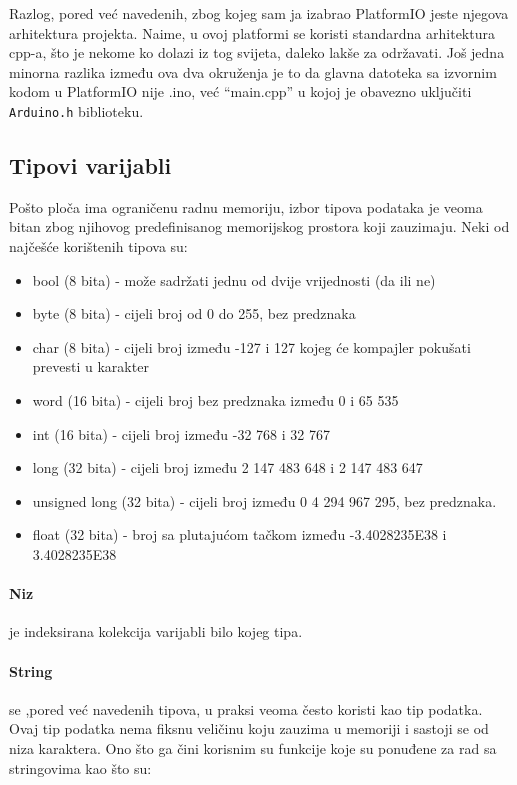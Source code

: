 \documentclass[../Document.tex]{subfiles}
\begin{document}
Razlog, pored već navedenih, zbog kojeg sam ja izabrao PlatformIO jeste njegova arhitektura projekta. Naime, u ovoj platformi se koristi standardna arhitektura cpp-a, što je nekome ko dolazi iz tog svijeta, daleko lakše za održavati. Još jedna minorna razlika između ova dva okruženja je to da glavna datoteka sa izvornim kodom u PlatformIO nije .ino, već ``main.cpp'' u kojoj je obavezno uključiti \verb|Arduino.h| biblioteku.

\subsection{Tipovi varijabli}

Pošto ploča ima ograničenu radnu memoriju, izbor tipova podataka je veoma bitan zbog njihovog predefinisanog memorijskog prostora koji zauzimaju. Neki od najčešće korištenih tipova su:

\begin{itemize}
  \item bool (8 bita) - može sadržati jednu od dvije vrijednosti (da ili ne)
  \item byte (8 bita) - cijeli broj od 0 do 255, bez predznaka
  \item char (8 bita) - cijeli broj između -127 i 127 kojeg će kompajler pokušati prevesti u karakter
  \item word (16 bita) - cijeli broj bez predznaka između 0 i 65 535
  \item int (16 bita) - cijeli broj između -32 768 i 32 767
  \item long (32 bita) - cijeli broj između 2 147 483 648 i 2 147 483 647
  \item unsigned long (32 bita) - cijeli broj između 0 4 294 967 295, bez predznaka.
  \item float (32 bita) -  broj sa plutajućom tačkom između -3.4028235E38 i 3.4028235E38
\end{itemize}

\paragraph{Niz} je indeksirana kolekcija varijabli bilo kojeg tipa.

\paragraph{String} se ,pored već navedenih tipova, u praksi veoma često koristi kao tip podatka. Ovaj tip podatka nema fiksnu veličinu koju zauzima u memoriji i sastoji se od niza karaktera. Ono što ga čini korisnim su funkcije koje su ponuđene za rad sa stringovima kao što su:
\end{document}
